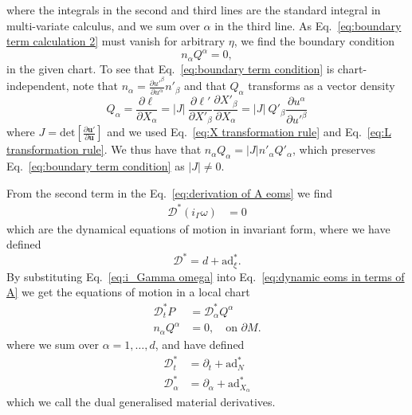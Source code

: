 where the integrals in the second and third lines are the standard integral in multi-variate calculus, and we sum over $\alpha$ in the third line. As Eq.~\ref{eq:boundary term calculation 2} must vanish for arbitrary $\eta$, we find the boundary condition
\begin{equation} \label{eq:boundary term condition}
n_\alpha Q^\alpha = 0,
\end{equation}
in the given chart. To see that Eq.~\ref{eq:boundary term condition} is chart-independent, note that $n_\alpha = \frac{\partial u'^\beta}{\partial u^\alpha} n'_\beta$ and that $Q_\alpha$ transforms as a vector density
\begin{equation}
Q_\alpha  = \frac{\partial \ell}{\partial X_\alpha} =   |J|\  \frac{\partial \ell'}{\partial X'_\beta}  \frac{\partial X'_\beta}{\partial X_\alpha}  = |J|\ Q'_\beta \frac{\partial u^\alpha}{\partial u'^\beta}
\end{equation}
where $J = \text{det} \left[ \frac{\partial \mathbf{u}' }{ \partial \mathbf{u} } \right] $ and we used Eq.~\ref{eq:X transformation rule} and Eq.~\ref{eq:L transformation rule}. We thus have that $n_\alpha Q_\alpha = |J| n'_\alpha Q'_\alpha$, which preserves Eq.~\ref{eq:boundary term condition} as $|J| \neq 0$.

From the second term in the Eq.~\ref{eq:derivation of A eoms} we find
\begin{subequations} \label{eq:dynamic eoms in terms of A}
\begin{align}
\mathcal{D}^* (i_\Gamma \omega) & = 0 
\end{align}
\end{subequations}
which are the dynamical equations of motion in invariant form, where we have defined
\begin{equation}
\mathcal{D}^* = d + \text{ad}_\xi^*.
\end{equation}
By substituting Eq.~\ref{eq:i_Gamma omega} into Eq.~\ref{eq:dynamic eoms in terms of A} we get the equations of motion in a local chart
\begin{subequations} \label{eq:dynamic eoms in terms of P and Q}
\begin{align}
\mathcal{D}^*_t P & =  \mathcal{D}^*_\alpha Q^\alpha \\
n_\alpha Q^\alpha & = 0, \quad \text{on } \partial M \label{eq:Q boundary condition}.
\end{align}
\end{subequations}
where we sum over $\alpha = 1, \dots, d$, and have defined
\begin{subequations}
\begin{align}
\mathcal{D}^*_t & = \partial_t + \text{ad}_N^* \\
\mathcal{D}^*_\alpha & = \partial_\alpha + \text{ad}_{X_\alpha}^*
\end{align}
\end{subequations}
which we call the dual generalised material derivatives.



